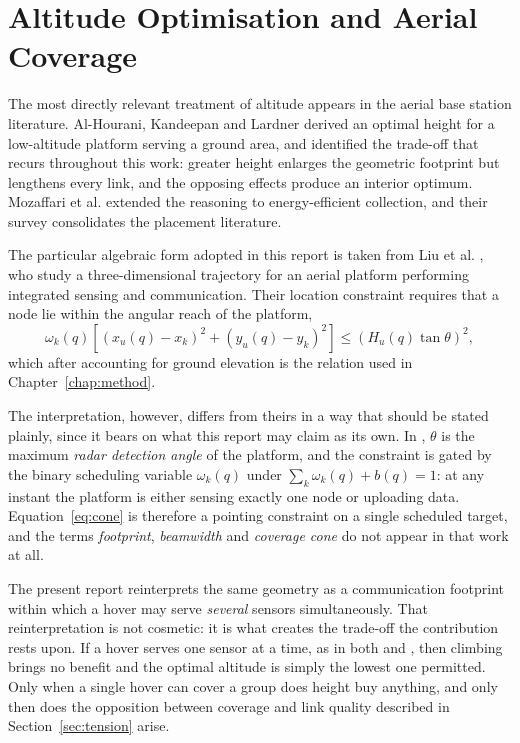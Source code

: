 \section{Altitude Optimisation and Aerial Coverage}
\label{sec:lit_altitude}

The most directly relevant treatment of altitude appears in the aerial base station literature. Al-Hourani, Kandeepan and Lardner \cite{alhourani2014optimal} derived an optimal height for a low-altitude platform serving a ground area, and identified the trade-off that recurs throughout this work: greater height enlarges the geometric footprint but lengthens every link, and the opposing effects produce an interior optimum. Mozaffari et al. \cite{mozaffari2017mobile} extended the reasoning to energy-efficient collection, and their survey \cite{mozaffari2019tutorial} consolidates the placement literature.

The particular algebraic form adopted in this report is taken from Liu et al. \cite{paperB}, who study a three-dimensional trajectory for an aerial platform performing integrated sensing and communication. Their location constraint requires that a node lie within the angular reach of the platform,
\begin{equation}
\omega_k(q) \left[ (x_u(q) - x_k)^2 + (y_u(q) - y_k)^2 \right] \le \left( H_u(q)\tan\theta \right)^{2} ,
\label{eq:cone}
\end{equation}
which after accounting for ground elevation is the relation used in Chapter~\ref{chap:method}.

The interpretation, however, differs from theirs in a way that should be stated plainly, since it bears on what this report may claim as its own. In \cite{paperB}, $\theta$ is the maximum \emph{radar detection angle} of the platform, and the constraint is gated by the binary scheduling variable $\omega_k(q)$ under $\sum_k \omega_k(q) + b(q) = 1$: at any instant the platform is either sensing exactly one node or uploading data. Equation~\eqref{eq:cone} is therefore a pointing constraint on a single scheduled target, and the terms \emph{footprint}, \emph{beamwidth} and \emph{coverage cone} do not appear in that work at all.

The present report reinterprets the same geometry as a communication footprint within which a hover may serve \emph{several} sensors simultaneously. That reinterpretation is not cosmetic: it is what creates the trade-off the contribution rests upon. If a hover serves one sensor at a time, as in both \cite{paperA} and \cite{paperB}, then climbing brings no benefit and the optimal altitude is simply the lowest one permitted. Only when a single hover can cover a group does height buy anything, and only then does the opposition between coverage and link quality described in Section~\ref{sec:tension} arise.

